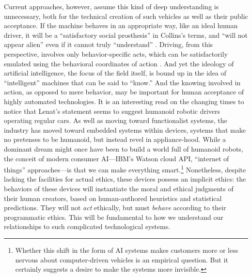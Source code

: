 Current approaches, however, assume this kind of deep understanding is
unnecessary, both for the technical creation of such vehicles as well
as their public acceptance. If the machine behaves in an appropriate
way, like an ideal human driver, it will be a ``satisfactory social
prosthesis'' in Collins's terms, and ``will not appear alien'' even if
it cannot truly ``understand'' \cite[p. 31]{Collins}. Driving, from
this perspective, involves only behavior-specific acts, which can be
satisfactorily emulated using the behavioral coordinates of
action \cite[p. 33--37]{Collins}. And yet the ideology of artificial
intelligence, the focus of the field itself, is bound up in the idea
of ``intelligent'' machines that can be said to ``know.'' And the
knowing involved in action, as opposed to mere behavior, may be
important for human acceptance of highly automated technologies. It is an
interesting read on the changing 
times to notice that Lenat's statement seems to suggest humanoid
robotic drivers operating regular cars. As well as moving toward
functionalist systems, the industry has moved toward embedded systems
within devices, systems that make no pretenses to be humanoid, but
instead revel in appliance-hood. While a dominant dream might once have been
to build a world full of humanoid robots, the conceit of modern
consumer AI---IBM's Watson cloud API, ``internet of things''
approaches---is that we can make everything smart.\footnote{Whether this shift
in the form of AI 
systems makes customers more or less nervous about computer-driven
vehicles is an empirical question. But it certainly suggests a desire
to make the systems more 
invisible.}
Nonetheless, despite lacking the facilities for actual ethics, these
devices possess an implicit ethics: the
behaviors of these devices will instantiate the moral and
ethical judgments of their human creators, based on
human-authored heuristics and statistical predictions. They will not
\emph{act} ethically, but must
\emph{behave} according to their programmatic ethics. This will be
fundamental to how we understand our relationships to such
complicated technological systems.

